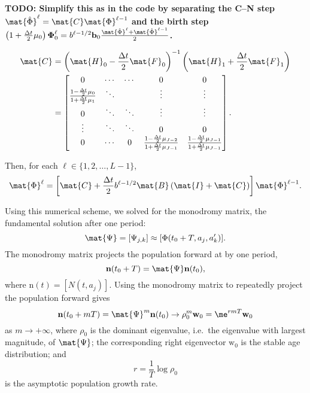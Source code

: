 \documentclass{jpmarticle}
\renewcommand{\vec}[1]{\boldsymbol{\mathrm{#1}}}
\let\subequationsorig\subequations%
\let\endsubequationsorig\endsubequations%
\renewenvironment{subequations}{
  \subequationsorig
  \renewcommand{\theequation}{\theparentequation.\arabic{equation}}
}{
  \endsubequationsorig
}
\begin{document}
\textbf{TODO: Simplify this as in the code by separating the C–N step
  $\mat{\hat{\Phi}}^{\ell} = \mat{C} \mat{\Phi}^{\ell - 1}$
  and the birth step
  $\left(1 + \frac{\Delta t}{2} \mu_0\right) \vec{\Phi}_0^{\ell} =
  b^{\ell - 1 / 2}\vec{b}_0
  \frac{\mat{\hat{\Phi}}^{\ell} + \mat{\hat{\Phi}}^{\ell - 1}}{2}$.}
\begin{subequations}
  \begin{align}
    \begin{split}
      \mat{C}
      &= \left(\mat{H}_0
        - \frac{\Delta t}{2} \mat{F}_0\right)^{-1}
      \left(\mat{H}_1
        + \frac{\Delta t}{2} \mat{F}_1\right)
      \\
      &=
      \begin{bmatrix}
        0 & \cdots & \cdots & 0 & 0
        \\
        \frac{1 - \frac{\Delta t}{2} \mu_0}
        {1 + \frac{\Delta t}{2} \mu_1}
        & \ddots & & \vdots & \vdots
        \\
        0 & \ddots & \ddots & \vdots & \vdots
        \\
        \vdots & \ddots & \ddots & 0 & 0
        \\
        0 & \cdots & 0 &
        \frac{1 - \frac{\Delta t}{2} \mu_{J - 2}}
        {1 + \frac{\Delta t}{2} \mu_{J - 1}}
        & \frac{1 - \frac{\Delta t}{2} \mu_{J - 1}}
        {1 + \frac{\Delta t}{2} \mu_{J - 1}}
      \end{bmatrix}.
    \end{split}
  \end{align}
\end{subequations}
Then, for each $\ell \in \{1, 2, \ldots, L - 1\}$,
\begin{equation}
  \mat{\Phi}^{\ell}
  =
  \left[\mat{C}
    +  \frac{\Delta t}{2} b^{\ell - 1 / 2} \mat{B}
    \left(\mat{I} + \mat{C}\right)
  \right]
  \mat{\Phi}^{\ell - 1}.
\end{equation}

Using this numerical scheme, we solved for the monodromy matrix, the
fundamental solution after one period:
\begin{equation}
  \mat{\Psi} = [\Psi_{j, k}] \approx [\Phi(t_0 + T, a_j, a'_k)].
\end{equation}
The monodromy matrix projects the population forward at by one period,
\begin{equation}
  \vec{n}(t_0 + T) = \mat{\Psi} \vec{n}(t_0),
\end{equation}
where $\vec{n}(t) = [N(t, a_j)]$.
Using the monodromy matrix to repeatedly project the population
forward gives
\begin{equation}
  \vec{n}(t_0 + m T)
  = \mat{\Psi}^m \vec{n}(t_0)
  \to \rho_0^m \vec{w}_0
  = \me^{r m T} \vec{w}_0
\end{equation}
as $m \to +\infty$, where $\rho_0$ is the dominant eigenvalue,
i.e.~the eigenvalue with largest magnitude, of $\mat{\Psi}$;
the corresponding right eigenvector $\vec{w}_0$ is the stable age
distribution; and
\begin{equation}
  r = \frac{1}{T} \log \rho_0
\end{equation}
is the asymptotic population growth rate.
\end{document}
